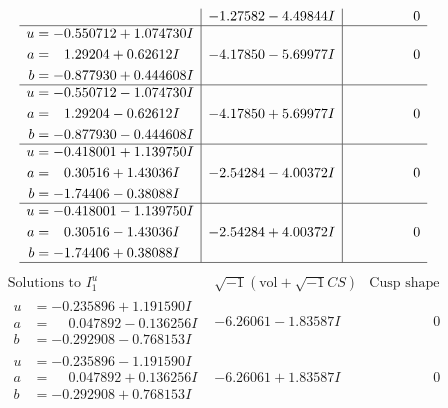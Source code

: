 \documentclass[1p]{elsarticle_modified}
\theoremstyle{definition}
\newcommand{\I}{\sqrt{-1}}
\begin{document}
$$\begin{array}{c|c|c}
 & -1.27582 - 4.49844 I & \phantom{-0.000000 } 0 \\ \hline\begin{aligned}
u &= -0.550712 + 1.074730 I \\
a &= \phantom{-}1.29204 + 0.62612 I \\
b &= -0.877930 + 0.444608 I\end{aligned}
 & -4.17850 - 5.69977 I & \phantom{-0.000000 } 0 \\ \hline\begin{aligned}
u &= -0.550712 - 1.074730 I \\
a &= \phantom{-}1.29204 - 0.62612 I \\
b &= -0.877930 - 0.444608 I\end{aligned}
 & -4.17850 + 5.69977 I & \phantom{-0.000000 } 0 \\ \hline\begin{aligned}
u &= -0.418001 + 1.139750 I \\
a &= \phantom{-}0.30516 + 1.43036 I \\
b &= -1.74406 - 0.38088 I\end{aligned}
 & -2.54284 - 4.00372 I & \phantom{-0.000000 } 0 \\ \hline\begin{aligned}
u &= -0.418001 - 1.139750 I \\
a &= \phantom{-}0.30516 - 1.43036 I \\
b &= -1.74406 + 0.38088 I\end{aligned}
 & -2.54284 + 4.00372 I & \phantom{-0.000000 } 0\\
 \hline 
 \end{array}$$\newpage$$\begin{array}{c|c|c}  
\text{Solutions to }I^u_{1}& \I (\text{vol} + \sqrt{-1}CS) & \text{Cusp shape}\\
 \hline 
\begin{aligned}
u &= -0.235896 + 1.191590 I \\
a &= \phantom{-}0.047892 - 0.136256 I \\
b &= -0.292908 - 0.768153 I\end{aligned}
 & -6.26061 - 1.83587 I & \phantom{-0.000000 } 0 \\ \hline\begin{aligned}
u &= -0.235896 - 1.191590 I \\
a &= \phantom{-}0.047892 + 0.136256 I \\
b &= -0.292908 + 0.768153 I\end{aligned}
 & -6.26061 + 1.83587 I & \phantom{-0.000000 } 0 \\ \hline\begin{aligned}

\end{aligned}
\end{array}$$
\end{document}
